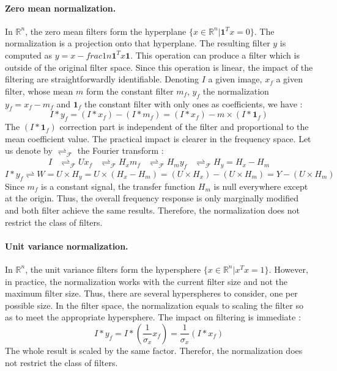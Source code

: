 \documentclass[a4paper]{report}
\begin{document}
			\paragraph{Zero mean normalization.}
			In $\mathbb{R}^n$, the zero mean filters form the hyperplane $\{x \in \mathbb{R}^n | \textbf{1}^{T}x = 0\}$. The normalization is a projection onto that hyperplane. The resulting filter $y$ is computed as $y = x - frac{1}{n}\textbf{1}^{T}x\textbf{1}$. This operation can produce a filter which is outside of the original filter space.
			Since this operation is linear, the impact of the filtering are straightforwardly identifiable. Denoting $I$ a given image, $x_f$ a given filter, whose mean $m$ form the constant filter $m_f$, $y_f$ the normalization $ y_f = x_f - m_f$ and $\textbf{1}_f$ the constant filter with only ones as coefficients, we have : 
			\[
				I * y_f = (I * x_f) - (I * m_f) = (I * x_f) - m \times (I * \textbf{1}_f)
			\]
			The $(I * \textbf{1}_f)$ correction part is independent of the filter and proportional to the mean coefficient value. The practical impact is clearer in the frequency space. Let us denote by $\rightleftharpoons_\mathcal{F}$ the Fourier transform : 
			\begin{align*}
				I &\rightleftharpoons_\mathcal{F} U
				x_f &\rightleftharpoons_\mathcal{F} H_x
				m_f &\rightleftharpoons_\mathcal{F} H_m
				y_f &\rightleftharpoons_\mathcal{F} H_y = H_x - H_m
			\end{align*}
			\[
				I * y_f \rightleftharpoons W = U \times H_y = U \times (H_x - H_m) = (U \times H_x) - (U \times H_m) = Y - (U \times H_m)
			\]
			Since $m_f$ is a constant signal, the transfer function $H_m$ is null everywhere except at the origin. Thus, the overall frequency response is only marginally modified and both filter achieve the same results.
			Therefore, the normalization does not restrict the class of filters.
			
			\paragraph{Unit variance normalization.}
			In $\mathbb{R}^n$, the unit variance filters form the hypersphere $\{x \in \mathbb{R}^n | x^{T}x = 1\}$. However, in practice, the normalization works with the current filter size and not the maximum filter size. Thus, there are several hyperspheres to consider, one per possible size. 
			In the filter space, the normalization equals to scaling the filter so as to meet the appropriate hypersphere. The impact on filtering is immediate :
			\[
				I * y_f = I * (\frac{1}{\sigma_x} x_f) = \frac{1}{\sigma_x} (I * x_f)
			\]
			The whole result is scaled by the same factor. Therefor, the normalization does not restrict the class of filters.
			
\end{document}
